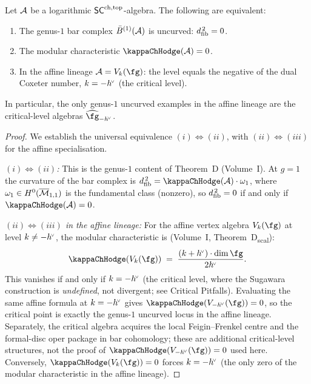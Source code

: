 \begin{theorem}
\label{thm:classification-uncurved}
Let $\mathcal{A}$ be a logarithmic $\mathsf{SC}^{\mathrm{ch,top}}$-algebra. The following
are equivalent:
\begin{enumerate}[label=\textup{(\roman*)}]
\item The genus-$1$ bar complex $\bar{B}^{(1)}(\mathcal{A})$ is uncurved:
 $d_{\mathrm{fib}}^{\,2} = 0$.
\item The modular characteristic $\kappaChHodge(\cA) = 0$.
\item In the affine lineage $\cA = V_k(\fg)$: the level equals
 the negative of the dual Coxeter number, $k = -h^{\!\scriptscriptstyle\vee}$
 \textup{(}the critical level\textup{)}.
\end{enumerate}
In particular, the only genus-$1$ uncurved examples in the affine lineage
are the critical-level algebras $\widehat{\fg}_{-\hvee}$.
\end{theorem}

\begin{proof}
We establish the universal equivalence
$(i) \Leftrightarrow (ii)$, with
$(ii) \Leftrightarrow (iii)$ for
the affine specialisation.

\smallskip\noindent
\emph{$(i) \Leftrightarrow (ii)$:} This is the genus-$1$ content of
Theorem~D (Volume~I). At $g = 1$ the curvature of the bar complex is
$\dfib^{\,2} = \kappaChHodge(\cA) \cdot \omega_1$, where
$\omega_1 \in H^0(\overline{\mathcal{M}}_{1,1})$ is the fundamental class
(nonzero), so $d_{\mathrm{fib}}^{\,2} = 0$ if and only if
$\kappaChHodge(\cA) = 0$.

\smallskip\noindent
\emph{$(ii) \Leftrightarrow (iii)$ in the affine lineage:}
For the affine vertex algebra $V_k(\fg)$ at level $k \neq
-h^{\!\scriptscriptstyle\vee}$, the modular characteristic is (Volume~I,
Theorem~D\textsubscript{scal}):
\[
\kappaChHodge(V_k(\fg))
\;=\;
\frac{(k + \hvee) \cdot \dim \fg}{2\hvee}.
\]
This vanishes if and only if $k = -h^{\!\scriptscriptstyle\vee}$ (the critical level,
where the Sugawara construction is \emph{undefined},
not divergent; see Critical Pitfalls). Evaluating the same affine
formula at $k=-h^{\!\scriptscriptstyle\vee}$ gives $\kappaChHodge(V_{-\hvee}(\fg))=0$, so the
critical point is exactly the genus-$1$ uncurved locus in the affine
lineage.
Separately, the critical algebra acquires the local
Feigin--Frenkel centre and the formal-disc oper package in bar
cohomology; these are additional critical-level structures, not the
proof of $\kappaChHodge(V_{-\hvee}(\fg))=0$ used here. Conversely,
$\kappaChHodge(V_k(\fg)) = 0$ forces $k = -h^{\!\scriptscriptstyle\vee}$ (the only zero of
the modular characteristic in the affine lineage).
\end{proof}

